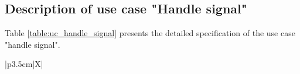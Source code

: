 \documentclass[../Main.tex]{subfiles}
\begin{document}
\subsection{Description of use case "Handle signal"}
\label{section:2.3.2}

Table \ref{table:uc_handle_signal} presents the detailed specification of the use case "handle signal".

\renewcommand{\arraystretch}{1.3}
\begin{xltabular}{\textwidth}{|p{3.5cm}|X|}
    \caption{Use case specification for "Handle signal"}
    \label{table:uc_handle_signal} \\
    \hline
    \endfirsthead

     \\
    \hline
    \endhead

    \hline
     \\
    \endfoot

    \hline
    \endlastfoot


\end{xltabular}
\end{document}
